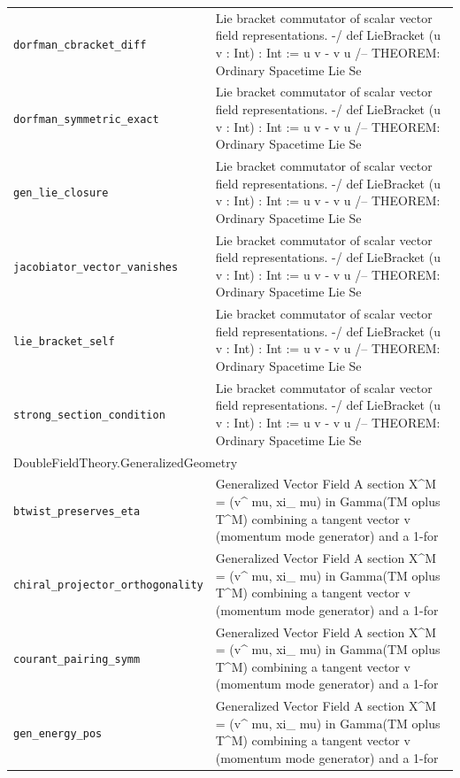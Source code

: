 \begin{longtable}{p{}p{}}
\quad\texttt{\footnotesize dorfman\_cbracket\_diff} & {\footnotesize Lie bracket commutator of scalar vector field representations. -/ def LieBracket (u v : Int) : Int := u v - v u /-- THEOREM: Ordinary Spacetime Lie Se} \\
\quad\texttt{\footnotesize dorfman\_symmetric\_exact} & {\footnotesize Lie bracket commutator of scalar vector field representations. -/ def LieBracket (u v : Int) : Int := u v - v u /-- THEOREM: Ordinary Spacetime Lie Se} \\
\quad\texttt{\footnotesize gen\_lie\_closure} & {\footnotesize Lie bracket commutator of scalar vector field representations. -/ def LieBracket (u v : Int) : Int := u v - v u /-- THEOREM: Ordinary Spacetime Lie Se} \\
\quad\texttt{\footnotesize jacobiator\_vector\_vanishes} & {\footnotesize Lie bracket commutator of scalar vector field representations. -/ def LieBracket (u v : Int) : Int := u v - v u /-- THEOREM: Ordinary Spacetime Lie Se} \\
\quad\texttt{\footnotesize lie\_bracket\_self} & {\footnotesize Lie bracket commutator of scalar vector field representations. -/ def LieBracket (u v : Int) : Int := u v - v u /-- THEOREM: Ordinary Spacetime Lie Se} \\
\quad\texttt{\footnotesize strong\_section\_condition} & {\footnotesize Lie bracket commutator of scalar vector field representations. -/ def LieBracket (u v : Int) : Int := u v - v u /-- THEOREM: Ordinary Spacetime Lie Se} \\
\multicolumn{2}{l}{\textsf{\small DoubleFieldTheory.GeneralizedGeometry}} \\
\quad\texttt{\footnotesize btwist\_preserves\_eta} & {\footnotesize Generalized Vector Field A section X\^{}M = (v\^{} mu,  xi\_ mu)  in  Gamma(TM  oplus T\^{}M) combining a tangent vector v (momentum mode generator) and a 1-for} \\
\quad\texttt{\footnotesize chiral\_projector\_orthogonality} & {\footnotesize Generalized Vector Field A section X\^{}M = (v\^{} mu,  xi\_ mu)  in  Gamma(TM  oplus T\^{}M) combining a tangent vector v (momentum mode generator) and a 1-for} \\
\quad\texttt{\footnotesize courant\_pairing\_symm} & {\footnotesize Generalized Vector Field A section X\^{}M = (v\^{} mu,  xi\_ mu)  in  Gamma(TM  oplus T\^{}M) combining a tangent vector v (momentum mode generator) and a 1-for} \\
\quad\texttt{\footnotesize gen\_energy\_pos} & {\footnotesize Generalized Vector Field A section X\^{}M = (v\^{} mu,  xi\_ mu)  in  Gamma(TM  oplus T\^{}M) combining a tangent vector v (momentum mode generator) and a 1-for} \\

\end{longtable}
